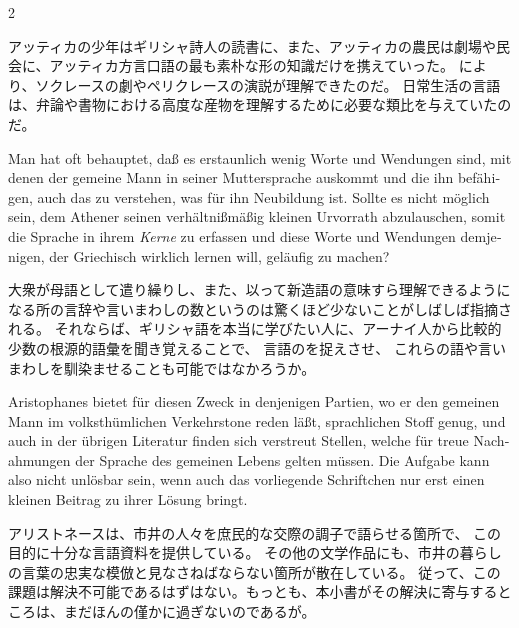 \begin{paracol}{2}
\begin{japanese}
アッティカの少年はギリシャ詩人の読書に、また、アッティカの農民は劇場や民会に、アッティカ方言口語の最も素朴な形の知識だけを携えていった。
により、ソクレースの劇やペリクレースの演説が理解できたのだ。
日常生活の言語は、弁論や書物における高度な産物を理解するために必要な類比を与えていたのだ。
\end{japanese}
\switchcolumn*

\begin{german}
Man hat oft behauptet, daß es erstaunlich wenig Worte und Wendungen
sind, mit denen der gemeine Mann in seiner Muttersprache aus\textcompwordmark{}kommt
und die ihn befähigen, auch das zu verstehen, was für ihn Neubildung
ist. Sollte es nicht möglich sein, dem Athener seinen verhältnißmäßig
kleinen Urvorrath abzulauschen, somit die Sprache in ihrem \emph{Kerne}
zu erfassen und diese Worte und Wendungen demjenigen, der Griechisch
wirklich lernen will, geläufig zu machen?
\end{german}
\switchcolumn

\begin{japanese}
大衆が母語として遣り繰りし、また、以って新造語の意味すら理解できるようになる所の言辞や言いまわしの数というのは驚くほど少ないことがしばしば指摘される。
それならば、ギリシャ語を本当に学びたい人に、アーナイ人から比較的少数の根源的語彙を聞き覚えることで、
言語のを捉えさせ、
これらの語や言いまわしを馴染ませることも可能ではなかろうか。
\end{japanese}
\switchcolumn*

\begin{german}
Aristophanes bietet für diesen Zweck in denjenigen Partien, wo er
den gemeinen Mann im volks\textcompwordmark{}thümlichen Verkehrs\textcompwordmark{}tone
reden läßt, sprachlichen Stoff genug, und auch in der übrigen Literatur
finden sich verstreut Stellen, welche für treue Nachahmungen der Sprache
des gemeinen Lebens gelten müssen. Die Aufgabe kann also nicht unlösbar
sein, wenn auch das vorliegende Schriftchen nur
erst einen kleinen Beitrag zu ihrer Lösung bringt.
\end{german}
\switchcolumn

\begin{japanese}
アリストネースは、市井の人々を庶民的な交際の調子で語らせる箇所で、
この目的に十分な言語資料を提供している。
その他の文学作品にも、市井の暮らしの言葉の忠実な模倣と見なさねばならない箇所が散在している。%
従って、この課題は解決不可能であるはずはない。もっとも、本小書がその解決に寄与するところは、まだほんの僅かに過ぎないのであるが。
\end{japanese}
\switchcolumn*


\end{paracol}
